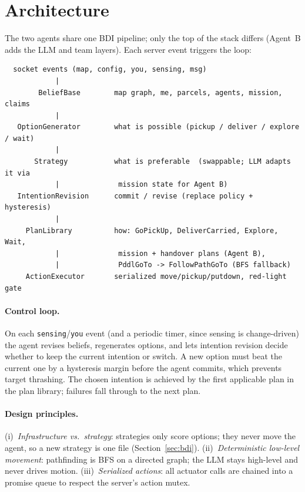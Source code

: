 \section{Architecture}
\label{sec:arch}

The two agents share one BDI pipeline; only the top of the stack differs
(Agent~B adds the LLM and team layers). Each server event triggers the loop:

\begin{verbatim}
  socket events (map, config, you, sensing, msg)
            |
        BeliefBase        map graph, me, parcels, agents, mission, claims
            |
   OptionGenerator        what is possible (pickup / deliver / explore / wait)
            |
       Strategy           what is preferable  (swappable; LLM adapts it via
            |              mission state for Agent B)
   IntentionRevision      commit / revise (replace policy + hysteresis)
            |
     PlanLibrary          how: GoPickUp, DeliverCarried, Explore, Wait,
            |              mission + handover plans (Agent B),
            |              PddlGoTo -> FollowPathGoTo (BFS fallback)
     ActionExecutor       serialized move/pickup/putdown, red-light gate
\end{verbatim}

\paragraph{Control loop.} On each \texttt{sensing}/\texttt{you} event (and a
periodic timer, since sensing is change-driven) the agent revises beliefs,
regenerates options, and lets intention revision decide whether to keep the
current intention or switch. A new option must beat the current one by a
hysteresis margin before the agent commits, which prevents target thrashing.
The chosen intention is achieved by the first applicable plan in the plan
library; failures fall through to the next plan.

\paragraph{Design principles.} (i)~\emph{Infrastructure vs.\ strategy}:
strategies only score options; they never move the agent, so a new strategy is
one file (Section~\ref{sec:bdi}). (ii)~\emph{Deterministic low-level
movement}: pathfinding is BFS on a directed graph; the LLM stays high-level and
never drives motion. (iii)~\emph{Serialized actions}: all actuator calls are
chained into a promise queue to respect the server's action mutex.

